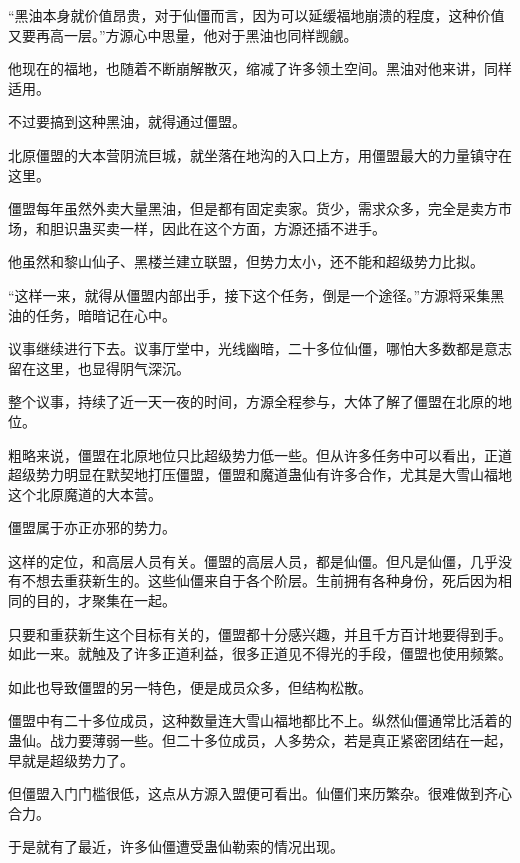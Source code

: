 
\begin{this_body}



“黑油本身就价值昂贵，对于仙僵而言，因为可以延缓福地崩溃的程度，这种价值又要再高一层。”方源心中思量，他对于黑油也同样觊觎。

他现在的福地，也随着不断崩解散灭，缩减了许多领土空间。黑油对他来讲，同样适用。

不过要搞到这种黑油，就得通过僵盟。

北原僵盟的大本营阴流巨城，就坐落在地沟的入口上方，用僵盟最大的力量镇守在这里。

僵盟每年虽然外卖大量黑油，但是都有固定卖家。货少，需求众多，完全是卖方市场，和胆识蛊买卖一样，因此在这个方面，方源还插不进手。

他虽然和黎山仙子、黑楼兰建立联盟，但势力太小，还不能和超级势力比拟。

“这样一来，就得从僵盟内部出手，接下这个任务，倒是一个途径。”方源将采集黑油的任务，暗暗记在心中。

议事继续进行下去。议事厅堂中，光线幽暗，二十多位仙僵，哪怕大多数都是意志留在这里，也显得阴气深沉。

整个议事，持续了近一天一夜的时间，方源全程参与，大体了解了僵盟在北原的地位。

粗略来说，僵盟在北原地位只比超级势力低一些。但从许多任务中可以看出，正道超级势力明显在默契地打压僵盟，僵盟和魔道蛊仙有许多合作，尤其是大雪山福地这个北原魔道的大本营。

僵盟属于亦正亦邪的势力。

这样的定位，和高层人员有关。僵盟的高层人员，都是仙僵。但凡是仙僵，几乎没有不想去重获新生的。这些仙僵来自于各个阶层。生前拥有各种身份，死后因为相同的目的，才聚集在一起。

只要和重获新生这个目标有关的，僵盟都十分感兴趣，并且千方百计地要得到手。如此一来。就触及了许多正道利益，很多正道见不得光的手段，僵盟也使用频繁。

如此也导致僵盟的另一特色，便是成员众多，但结构松散。

僵盟中有二十多位成员，这种数量连大雪山福地都比不上。纵然仙僵通常比活着的蛊仙。战力要薄弱一些。但二十多位成员，人多势众，若是真正紧密团结在一起，早就是超级势力了。

但僵盟入门门槛很低，这点从方源入盟便可看出。仙僵们来历繁杂。很难做到齐心合力。

于是就有了最近，许多仙僵遭受蛊仙勒索的情况出现。


\end{this_body}
